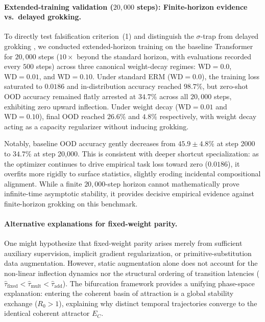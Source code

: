 \documentclass{article}
\theoremstyle{definition}
\begin{document}
\paragraph*{Extended-training validation ($20{,}000$ steps): Finite-horizon evidence vs.\ delayed grokking.}
To directly test falsification criterion~(1) and distinguish the $\sigma$-trap from delayed grokking \citep{power2022grokking}, we conducted extended-horizon training on the baseline Transformer for $20{,}000$ steps ($10\times$ beyond the standard horizon, with evaluations recorded every $500$ steps) across three canonical weight-decay regimes: $\text{WD}=0.0$, $\text{WD}=0.01$, and $\text{WD}=0.10$. Under standard ERM ($\text{WD}=0.0$), the training loss saturated to $0.0186$ and in-distribution accuracy reached $98.7\%$, but zero-shot OOD accuracy remained flatly arrested at $34.7\%$ across all $20{,}000$ steps, exhibiting zero upward inflection. Under weight decay ($\text{WD}=0.01$ and $\text{WD}=0.10$), final OOD reached $26.6\%$ and $4.8\%$ respectively, with weight decay acting as a capacity regularizer without inducing grokking. 

Notably, baseline OOD accuracy gently decreases from $45.9 \pm 4.8\%$ at step 2000 to $34.7\%$ at step 20,000. This is consistent with deeper shortcut specialization: as the optimizer continues to drive empirical task loss toward zero ($0.0186$), it overfits more rigidly to surface statistics, slightly eroding incidental compositional alignment. While a finite $20{,}000$-step horizon cannot mathematically prove infinite-time asymptotic stability, it provides decisive empirical evidence against finite-horizon grokking on this benchmark.

\paragraph*{Alternative explanations for fixed-weight parity.}
One might hypothesize that fixed-weight parity arises merely from sufficient auxiliary supervision, implicit gradient regularization, or primitive-substitution data augmentation. However, static augmentation alone does not account for the non-linear inflection dynamics nor the structural ordering of transition latencies ($\hat{\tau}_{\text{fixed}} < \hat{\tau}_{\text{mult}} < \hat{\tau}_{\text{add}}$). The bifurcation framework provides a unifying phase-space explanation: entering the coherent basin of attraction is a global stability exchange ($R_0 > 1$), explaining why distinct temporal trajectories converge to the identical coherent attractor $E_C$.
\end{document}
